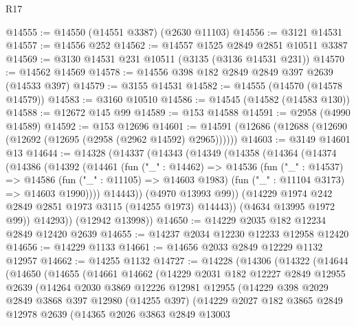 \begin{lexlean}{R17}
\begin{coremodule}
@14555 := @14550 (@14551 @3387) (@2630 @11103)
@14556 := @3121 @14531
@14557 := @14556 @252
@14562 := @14557 @1525 @2849 @2851 @10511 @3387
@14569 := @3130 @14531 @231 @10511 (@3135 (@3136 @14531 @231))
@14570 := @14562 @14569
@14578 := @14556 @398 @182 @2849 @2849 @397 @2639 (@14533 @397)
@14579 := @3155 @14531
@14582 := @14555 (@14570 (@14578 @14579))
@14583 := @3160 @10510
@14586 := @14545 (@14582 (@14583 @130))
@14588 := @12672 @145 @99
@14589 := @153 @14588
@14591 := @2958 (@4990 @14589)
@14592 := @153 @12696
@14601 := @14591 (@12686 (@12688 (@12690 (@12692 (@12695 (@2958 (@2962 @14592) @2965))))))
@14603 := @3149 @14601 @13
@14644 := @14328
    (@14337
      (@14343
        (@14349
          (@14358
            (@14364
              (@14374
                (@14386
                  (@14392
                    (@14461
                      (fun ("_" : @14462) =>
                      @14536
                        (fun ("_" : @14537) =>
                        @14586
                          (fun ("_" : @11105) => @14603 @1983)
                          (fun ("_" : @11104 @3173) => @14603 @1990))))
                    @14443))
                (@4970 @13993 @99))
              (@14229 @1974 @242 @2849 @2851 @1973 @3115 (@14255 @1973) @14443))
            (@4634 @13995 @1972 @99))
          @14293))
      (@12942 @13998))
@14650 := @14229 @2035 @182 @12234 @2849 @12420 @2639
@14655 := @14237 @2034 @12230 @12233 @12958 @12420
@14656 := @14229 @1133
@14661 := @14656 @2033 @2849 @12229 @1132 @12957
@14662 := @14255 @1132
@14727 := @14228
    (@14306
      (@14322
        (@14644
          (@14650
            (@14655
              (@14661
                @14662
                (@14229
                  @2031
                  @182
                  @12227
                  @2849
                  @12955
                  @2639
                  (@14264
                    @2030
                    @3869
                    @12226
                    @12981
                    @12955
                    (@14229
                      @398
                      @2029
                      @2849
                      @3868
                      @397
                      @12980
                      (@14255 @397)
                      (@14229
                        @2027
                        @182
                        @3865
                        @2849
                        @12978
                        @2639
                        (@14365
                          @2026
                          @3863
                          @2849
                          @13003

\end{coremodule}
\end{lexlean}

